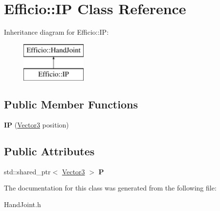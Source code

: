 \hypertarget{class_efficio_1_1_i_p}{}\section{Efficio\+:\+:IP Class Reference}
\label{class_efficio_1_1_i_p}
Inheritance diagram for Efficio\+:\+:IP\+:\begin{figure}[H]
\begin{center}
\leavevmode
\includegraphics[height=2.000000cm]{class_efficio_1_1_i_p}
\end{center}
\end{figure}
\subsection*{Public Member Functions}
\begin{DoxyCompactItemize}
\item 
{\bfseries IP} (\hyperlink{class_efficio_1_1_vector3}{Vector3} position)\hypertarget{class_efficio_1_1_i_p_a531c41633c47e34b57b261860b3d0182}{}\label{class_efficio_1_1_i_p_a531c41633c47e34b57b261860b3d0182}

\end{DoxyCompactItemize}
\subsection*{Public Attributes}
\begin{DoxyCompactItemize}
\item 
std\+::shared\+\_\+ptr$<$ \hyperlink{class_efficio_1_1_vector3}{Vector3} $>$ {\bfseries P}\hypertarget{class_efficio_1_1_i_p_a2b4e211b01e39ae156c616c7051b3a51}{}\label{class_efficio_1_1_i_p_a2b4e211b01e39ae156c616c7051b3a51}

\end{DoxyCompactItemize}


The documentation for this class was generated from the following file\+:\begin{DoxyCompactItemize}
\item 
Hand\+Joint.\+h\end{DoxyCompactItemize}
